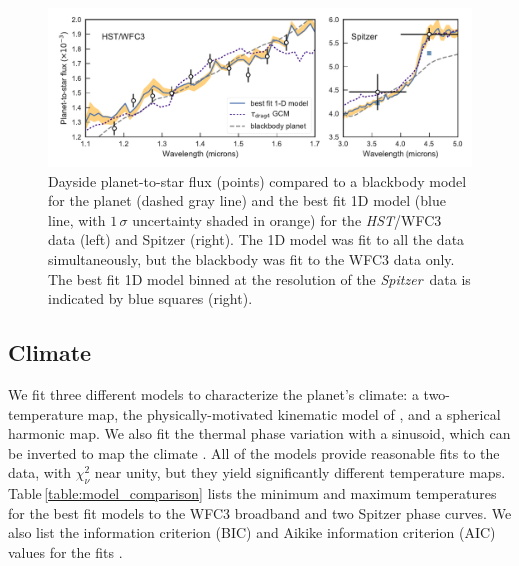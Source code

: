 \documentclass[twocolumn]{aastex61}
\newcommand{\project}[1]{\textsl{#1}}
\newcommand{\HST}{\project{HST}}
\newcommand{\Spitzer}{\project{Spitzer}}
\begin{document}
\begin{figure}
\includegraphics[width = 1.0\textwidth]{Figures/twopanel_dayside_spectrum.pdf}
\caption{Dayside planet-to-star flux (points) compared to a blackbody model for the planet (dashed gray line) and the best fit 1D model (blue line, with $1\,\sigma$ uncertainty shaded in orange) for the \HST/WFC3 data (left) and Spitzer (right). The 1D model was fit to all the data simultaneously, but the blackbody was fit to the WFC3 data only. The best fit 1D model binned at the resolution of the \Spitzer\ data is indicated by blue squares (right).} 
\label{fig:dayside}
\end{figure}


\subsection{Climate}
We fit three different models to characterize the planet's climate: a two-temperature map, the physically-motivated kinematic model of \cite{zhang17}, and a spherical harmonic map. We also fit the thermal phase variation with a sinusoid, which can be inverted to map the climate \citep{cowan08, cowan17}.  All of the models provide reasonable fits to the data, with $\chi^2_\nu$ near unity, but they yield significantly different temperature maps. Table\,\ref{table:model_comparison} lists the minimum and maximum temperatures for the best fit models to the WFC3 broadband and two Spitzer phase curves. We also list the  information criterion (BIC) and Aikike information criterion (AIC) values for the fits \citep[a $\Delta$BIC value greater than 10 constitutes strong evidence against a given model;][]{kass95}.

\end{document}
